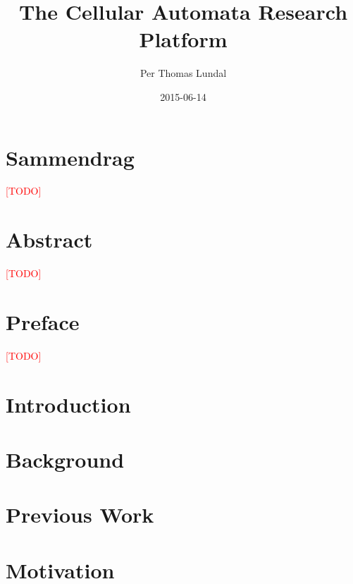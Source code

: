 \documentclass[a4paper]{report}
\title{
    {The Cellular Automata Research Platform}\\
    \TODO
}
\author{Per Thomas Lundal}
\date{2015-06-14}
\newcommand\TODO{\textcolor{red}{[TODO]}}
\begin{document}
\maketitle


\newpage
{}
{}
\chapter*{Sammendrag}
    \TODO

\newpage
{}
{}
\chapter*{Abstract}
    \TODO

\newpage
{}
{}
\chapter*{Preface}
    \TODO

\setcounter{tocdepth}{2}

\newpage
{}
{}
\tableofcontents

\newpage
{}
{}
\listoffigures

\newpage
{}
{}
\listoftables

\newpage


\chapter{Introduction}
    \label{ch:introduction}
    

\chapter{Background}
    \label{ch:background}
    

\chapter{Previous Work}
    \label{ch:previous-work}
    

\chapter{Motivation}
    \label{ch:motivation}
    
\end{document}
